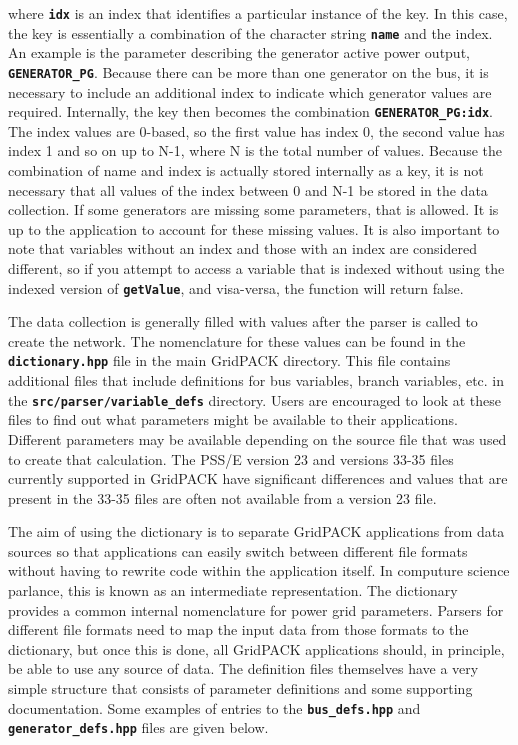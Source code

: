 where \texttt{\textbf{idx}} is an index that identifies a particular instance of
the key. In this case, the key is essentially a combination of the character
string \texttt{\textbf{name}} and the index. An example is the parameter
describing the generator active power output, \texttt{\textbf{GENERATOR\_PG}}.
Because there can be more than one generator on the bus, it is necessary to
include an additional index to indicate which generator values are required.
Internally, the key then becomes the combination
\texttt{\textbf{GENERATOR\_PG:idx}}. The index values are 0-based, so the first
value has index 0, the second value has index 1 and so on up to N-1, where N is
the total number of values. Because the combination of name and index
is actually stored internally as a key, it is not necessary that all values of
the index between 0 and N-1 be stored in the data collection. If some generators
are missing some parameters, that is allowed. It is up to the application to
account for these missing values. It is also important to note that variables
without an index and those with an index are considered different, so if you
attempt to access a variable that is indexed without using the indexed version
of \texttt{\textbf{getValue}}, and visa-versa, the function will return false.

The data collection is generally filled with values after the parser is called
to create the network. The nomenclature for these values can be found in the
\texttt{\textbf{dictionary.hpp}} file
in the main GridPACK directory. This file contains additional files that
include definitions for bus variables, branch variables, etc. in the
\texttt{\textbf{src/parser/variable\_defs}} directory. Users are encouraged to
look at these files to find out what parameters might be available to their
applications. Different parameters may be available depending on the
source file that was used to create that calculation. The PSS/E version 23 and
versions 33-35 files currently supported in GridPACK have significant
differences and values that are present in the 33-35 files are often not available from a version 23 file.

The aim of using the dictionary is to separate GridPACK applications from data
sources so that applications can easily switch between different file formats
without having to rewrite code within the application itself. In computure
science parlance, this is known as an intermediate representation. The dictionary provides a common internal nomenclature for power grid parameters. Parsers for different file formats need to map the input data from those formats to the dictionary, but once this is done, all GridPACK applications should, in principle, be able to use any source of data.
The definition files themselves have a very simple structure that consists of
parameter definitions and some supporting documentation. Some examples of
entries to the \texttt{\textbf{bus\_defs.hpp}} and
\texttt{\textbf{generator\_defs.hpp}} files are given below.

